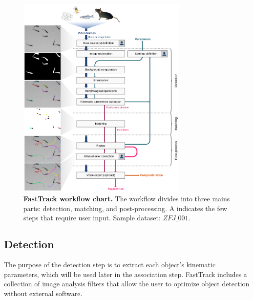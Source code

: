    \begin{figure}[h!]
    \centering
    \includegraphics[width=0.75\textwidth]{part_1/assets/Figure_1.png}
    \caption{{\bf FastTrack workflow chart.} The workflow divides into three mains parts: detection, matching, and post-processing. A \faUser indicates the few steps that require user input. Sample dataset: $ZFJ\_001$.}
    \label{part_1:fig_1}
    \end{figure}

    \subsection{Detection}
    The purpose of the detection step is to extract each object's kinematic parameters, which will be used later in the association step. FastTrack includes a collection of image analysis filters that allow the user to optimize object detection without external software.
